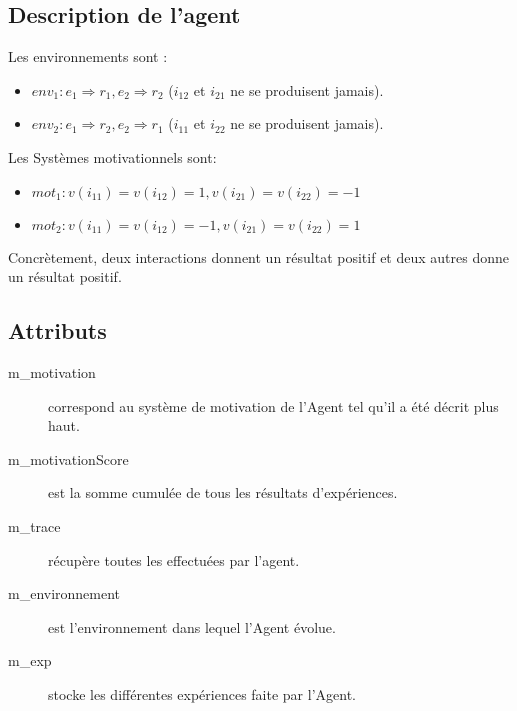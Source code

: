 \documentclass[11pt]{article}
\begin{document}
    \subsection{Description de l'agent}
    Les environnements sont :
      \begin{itemize}
      \item \begin{math} env_1: e_1 \Rightarrow r_1, e_2 \Rightarrow r_2 \end{math} 
      (\begin{math} i_{12}\end{math}  et \begin{math} i_{21}\end{math}  ne se produisent jamais).
      \item \begin{math} env_2:  e_1 \Rightarrow r_2, e_2 \Rightarrow r_1 \end{math} 
      (\begin{math} i_{11} \end{math} et \begin{math} i_{22}\end{math}  ne se produisent jamais).
      \end{itemize}
    Les Systèmes motivationnels sont:
      \begin{itemize}
      \item \begin{math} mot_1:  v(i_{11}) = v(i_{12}) = 1,v(i_{21}) = v(i_{22}) = -1\end{math}
      \item \begin{math} mot_2:  v(i_{11}) = v(i_{12}) = -1,v(i_{21}) = v(i_{22}) = 1 \end{math}
      \end{itemize}
      
      Concrètement, deux interactions donnent un résultat positif et deux autres donne un résultat positif.
    \subsection{Attributs}
      
      
      \begin{description}
	\item[m\_motivation] correspond au système de motivation de l'Agent tel qu'il a été décrit plus haut.	
	\item[m\_motivationScore] est la somme cumulée de tous les résultats d'expériences.
	\item[m\_trace] récupère toutes les effectuées par l'agent.
	\item[m\_environnement] est l'environnement dans lequel l'Agent évolue.
	\item[m\_exp] stocke les différentes expériences faite par l'Agent.
      \end{description}
\end{document}
